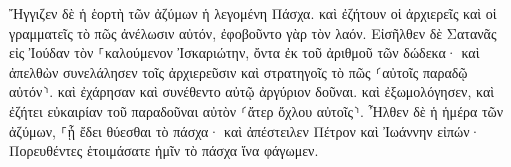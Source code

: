 \documentclass{openreader}
\begin{document}
Ἤγγιζεν δὲ ἡ ἑορτὴ τῶν ἀζύμων ἡ λεγομένη Πάσχα. 
καὶ ἐζήτουν οἱ ἀρχιερεῖς καὶ οἱ γραμματεῖς τὸ πῶς ἀνέλωσιν αὐτόν, ἐφοβοῦντο γὰρ τὸν λαόν. 
Εἰσῆλθεν δὲ Σατανᾶς εἰς Ἰούδαν τὸν ⸀καλούμενον Ἰσκαριώτην, ὄντα ἐκ τοῦ ἀριθμοῦ τῶν δώδεκα· 
καὶ ἀπελθὼν συνελάλησεν τοῖς ἀρχιερεῦσιν καὶ στρατηγοῖς τὸ πῶς ⸂αὐτοῖς παραδῷ αὐτόν⸃. 
καὶ ἐχάρησαν καὶ συνέθεντο αὐτῷ ἀργύριον δοῦναι. 
καὶ ἐξωμολόγησεν, καὶ ἐζήτει εὐκαιρίαν τοῦ παραδοῦναι αὐτὸν ⸂ἄτερ ὄχλου αὐτοῖς⸃. 
Ἦλθεν δὲ ἡ ἡμέρα τῶν ἀζύμων, ⸀ᾗ ἔδει θύεσθαι τὸ πάσχα· 
καὶ ἀπέστειλεν Πέτρον καὶ Ἰωάννην εἰπών· Πορευθέντες ἑτοιμάσατε ἡμῖν τὸ πάσχα ἵνα φάγωμεν. 
\end{document}
